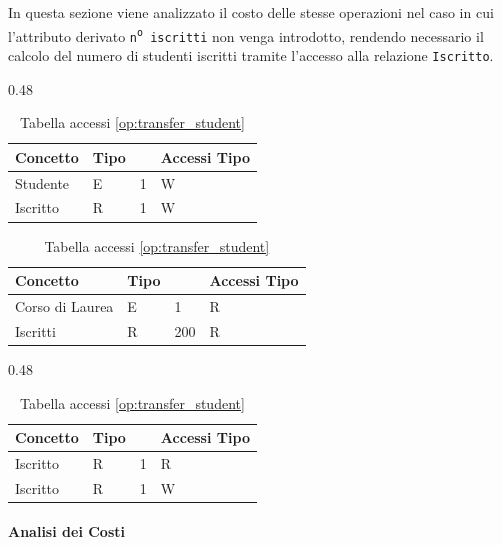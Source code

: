 \documentclass[a4paper,11pt]{article}
\begin{document}
In questa sezione viene analizzato il costo delle stesse operazioni nel caso in cui l'attributo derivato \texttt{n\textsuperscript{o} iscritti} non venga introdotto, rendendo necessario il calcolo del numero di studenti iscritti tramite l'accesso alla relazione \texttt{Iscritto}.

\begin{table}[H]
    \centering
    \begin{subtable}{0.48\textwidth}
        \centering
        \begin{tabular}{l l l l}
            \toprule
            \textbf{Concetto} & \textbf{Tipo} & & \textbf{Accessi} \textbf{Tipo} \\
            \midrule
            Studente & E & 1 & W \\
            Iscritto & R & 1 & W \\
            \bottomrule
        \end{tabular}
        \caption{Tabella accessi \ref{op:insert_student}}
        \vspace{1cm}
        \begin{tabular}{l l l l}
            \toprule
            \textbf{Concetto} & \textbf{Tipo} & & \textbf{Accessi} \textbf{Tipo} \\
            \midrule
            Corso di Laurea & E & 1 & R \\
            Iscritti & R & 200 & R \\
            \bottomrule
        \end{tabular}
        \caption{Tabella accessi \ref{op:get_info_degree}}
    \end{subtable}
    \hfill
    \begin{subtable}{0.48\textwidth}
        \centering
        \begin{tabular}{l l l l}
            \toprule
            \textbf{Concetto} & \textbf{Tipo} & & \textbf{Accessi} \textbf{Tipo} \\
            \midrule
            Iscritto & R & 1 & R \\
            Iscritto & R & 1 & W \\
            \bottomrule
        \end{tabular}
        \caption{Tabella accessi \ref{op:transfer_student}}
    \end{subtable}
\end{table}


\paragraph{Analisi dei Costi}
\end{document}
